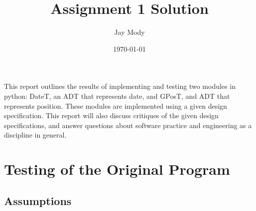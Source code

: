 \documentclass[12pt]{article}
\title{Assignment 1 Solution}
\author{Jay Mody}
\date{\today}
\begin{document}
\maketitle

This report outlines the results of implementing and testing two modules in python: DateT, an ADT that represents date, and GPosT, and ADT that represents position. These modules are implemented using a given design specification. This report will also discuss critiques of the given design specifications, and answer questions about software practice and engineering as a discipline in general.

\section{Testing of the Original Program}
\subsection{Assumptions}
\end{document}
